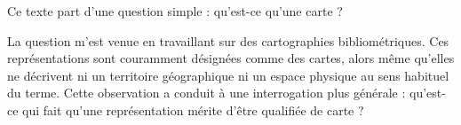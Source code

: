 




Ce texte part d'une question simple : qu'est-ce qu'une carte ?

La question m'est venue en travaillant sur des cartographies bibliométriques. Ces représentations sont couramment désignées comme des cartes, alors même qu'elles ne décrivent ni un territoire géographique ni un espace physique au sens habituel du terme. Cette observation a conduit à une interrogation plus générale : qu'est-ce qui fait qu'une représentation mérite d'être qualifiée de carte ?

